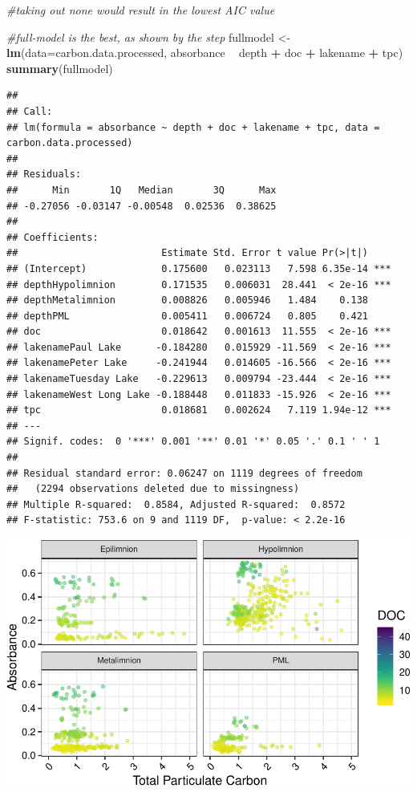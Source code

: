 \documentclass[12pt,]{article}
\newenvironment{Shaded}{\begin{snugshade}}{\end{snugshade}}
\newcommand{\KeywordTok}[1]{\textcolor[rgb]{0.13,0.29,0.53}{\textbf{#1}}}
\newcommand{\DataTypeTok}[1]{\textcolor[rgb]{0.13,0.29,0.53}{#1}}
\newcommand{\StringTok}[1]{\textcolor[rgb]{0.31,0.60,0.02}{#1}}
\newcommand{\CommentTok}[1]{\textcolor[rgb]{0.56,0.35,0.01}{\textit{#1}}}
\newcommand{\OperatorTok}[1]{\textcolor[rgb]{0.81,0.36,0.00}{\textbf{#1}}}
\newcommand{\NormalTok}[1]{#1}
\begin{document}
\begin{Shaded}
\begin{Highlighting}[]
\CommentTok{#taking out none would result in the lowest AIC value}

\CommentTok{#full-model is the best, as shown by the step }
\NormalTok{fullmodel <-}\StringTok{ }\KeywordTok{lm}\NormalTok{(}\DataTypeTok{data=}\NormalTok{carbon.data.processed, absorbance }\OperatorTok{~}\StringTok{ }\NormalTok{depth }\OperatorTok{+}\StringTok{ }\NormalTok{doc  }\OperatorTok{+}\StringTok{ }\NormalTok{lakename }\OperatorTok{+}\StringTok{ }\NormalTok{tpc)}
\KeywordTok{summary}\NormalTok{(fullmodel)}
\end{Highlighting}
\end{Shaded}

\begin{verbatim}
## 
## Call:
## lm(formula = absorbance ~ depth + doc + lakename + tpc, data = carbon.data.processed)
## 
## Residuals:
##      Min       1Q   Median       3Q      Max 
## -0.27056 -0.03147 -0.00548  0.02536  0.38625 
## 
## Coefficients:
##                         Estimate Std. Error t value Pr(>|t|)    
## (Intercept)             0.175600   0.023113   7.598 6.35e-14 ***
## depthHypolimnion        0.171535   0.006031  28.441  < 2e-16 ***
## depthMetalimnion        0.008826   0.005946   1.484    0.138    
## depthPML                0.005411   0.006724   0.805    0.421    
## doc                     0.018642   0.001613  11.555  < 2e-16 ***
## lakenamePaul Lake      -0.184280   0.015929 -11.569  < 2e-16 ***
## lakenamePeter Lake     -0.241944   0.014605 -16.566  < 2e-16 ***
## lakenameTuesday Lake   -0.229613   0.009794 -23.444  < 2e-16 ***
## lakenameWest Long Lake -0.188448   0.011833 -15.926  < 2e-16 ***
## tpc                     0.018681   0.002624   7.119 1.94e-12 ***
## ---
## Signif. codes:  0 '***' 0.001 '**' 0.01 '*' 0.05 '.' 0.1 ' ' 1
## 
## Residual standard error: 0.06247 on 1119 degrees of freedom
##   (2294 observations deleted due to missingness)
## Multiple R-squared:  0.8584, Adjusted R-squared:  0.8572 
## F-statistic: 753.6 on 9 and 1119 DF,  p-value: < 2.2e-16
\end{verbatim}

\includegraphics{Bash_ENV872_Project_files/figure-latex/linreg-1.pdf}
\newpage
\end{document}
